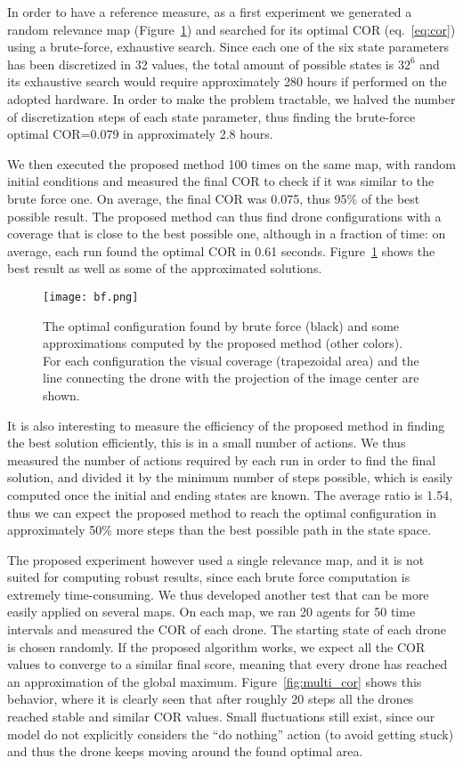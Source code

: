 \documentclass{article}
\begin{document}
In order to have a reference measure, as a first experiment we generated a random relevance map (Figure~\ref{fig:bf}) and searched for its optimal COR (eq.~\ref{eq:cor}) using a brute-force, exhaustive search. Since each one of the six state parameters has been discretized in 32 values, the total amount of possible states is $32^6$ and its exhaustive search would require approximately 280 hours if performed on the adopted hardware. In order to make the problem tractable, we halved the number of discretization steps of each state parameter, thus finding the brute-force optimal COR=0.079 in approximately 2.8 hours. 

We then executed the proposed method 100 times on the same map, with random initial conditions and measured the final COR to check if it was similar to the brute force one. On average, the final COR was 0.075, thus 95\% of the best possible result. The proposed method can thus find drone configurations with a coverage that is close to the best possible one, although in a fraction of time: on average, each run found the optimal COR in 0.61 seconds. Figure~\ref{fig:bf} shows the best result as well as some of the approximated solutions.
\begin{figure}
	\centering
	\texttt{[image: bf.png]}
	\caption{The optimal configuration found by brute force (black) and some approximations computed by the proposed method (other colors). For each configuration  the visual coverage (trapezoidal area) and the line connecting the drone with the projection of the image center are shown.}
	\label{fig:bf}
\end{figure} 
 
It is also interesting to measure the efficiency of the proposed method in finding the best solution efficiently, this is in a small number of actions. We thus measured the number of actions required by each run in order to find the final solution, and divided it by the minimum number of steps possible, which is easily computed once the initial and ending states are known. The average ratio is 1.54, thus we can expect the proposed method to reach the optimal configuration in approximately 50\% more steps than the best possible path in the state space.

The proposed experiment however used a single relevance map, and it is not suited for computing robust results, since each brute force computation is extremely time-consuming. We thus developed another test that can be more easily applied on several maps. On each map, we ran 20 agents for 50 time intervals and measured the COR of each drone. The starting state of each drone is chosen randomly. If the proposed algorithm works, we expect all the COR values to converge to a similar final score, meaning that every drone has reached an approximation of the global maximum. Figure~\ref{fig:multi_cor} shows this behavior, where it is clearly seen that after roughly 20 steps all the drones reached stable and similar COR values. Small fluctuations still exist, since our model do not explicitly considers the ``do nothing'' action (to avoid getting stuck) and thus the drone keeps moving around the found optimal area.
\end{document}

